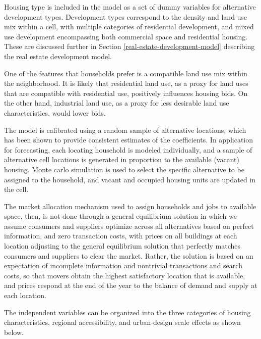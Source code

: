 Housing type is included in the model as a set of dummy variables
for alternative development types.  Development types correspond
to the density and land use mix within a cell, with multiple
categories of residential development, and mixed use development
encompassing both commercial space and residential housing.  These
are discussed further in Section
\ref{real-estate-development-model} describing the real estate
development model.

One of the features that households prefer is a compatible land
use mix within the neighborhood.  It is likely that residential
land use, as a proxy for land uses that are compatible with
residential use, positively influences housing bids.   On the
other hand, industrial land use, as a proxy for less desirable
land use characteristics, would lower bids.

The model is calibrated using a random sample of alternative
locations, which has been shown to provide consistent estimates of
the coefficients.  In application for forecasting, each locating
household is modeled individually, and a sample of alternative
cell locations is generated in proportion to the available
(vacant) housing. Monte carlo simulation is used to select the
specific alternative to be assigned to the household, and vacant
and occupied housing units are updated in the cell.

The market allocation mechanism used to assign households and jobs
to available space, then, is not done through a general
equilibrium solution in which we assume consumers and suppliers
optimize across all alternatives based on perfect information, and
zero transaction costs, with prices on all buildings at each
location adjusting to the general equilibrium solution that
perfectly matches consumers and suppliers to clear the market.
Rather, the solution is based on an expectation of incomplete
information and nontrivial transactions and search costs, so that
movers obtain the highest satisfactory location that is available,
and prices respond at the end of the year to the balance of demand
and supply at each location.

The independent variables can be organized into the three
categories of housing characteristics, regional accessibility, and
urban-design scale effects as shown below.

